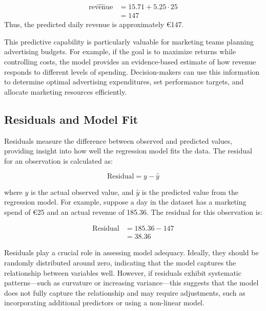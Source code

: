 \documentclass[
]{book}
\theoremstyle{definition}
\theoremstyle{definition}
\theoremstyle{definition}
\theoremstyle{definition}
\theoremstyle{remark}
\begin{document}
\begin{equation} 
\begin{split}
\hat{\text{revenue}} & = 15.71 + 5.25 \cdot 25 \\
 & = 147
\end{split}
\end{equation}
Thus, the predicted daily revenue is approximately €147.

This predictive capability is particularly valuable for marketing teams planning advertising budgets. For example, if the goal is to maximize returns while controlling costs, the model provides an evidence-based estimate of how revenue responds to different levels of spending. Decision-makers can use this information to determine optimal advertising expenditures, set performance targets, and allocate marketing resources efficiently.

\subsection*{Residuals and Model Fit}\label{residuals-and-model-fit}

Residuals measure the difference between observed and predicted values, providing insight into how well the regression model fits the data. The residual for an observation is calculated as:

\[
\text{Residual} = y - \hat{y}
\]

where \(y\) is the actual observed value, and \(\hat{y}\) is the predicted value from the regression model. For example, suppose a day in the dataset has a marketing spend of €25 and an actual revenue of 185.36. The residual for this observation is:

\begin{equation} 
\begin{split}
\text{Residual} & = 185.36 - 147 \\
 & = 38.36
\end{split}
\end{equation}

Residuals play a crucial role in assessing model adequacy. Ideally, they should be randomly distributed around zero, indicating that the model captures the relationship between variables well. However, if residuals exhibit systematic patterns---such as curvature or increasing variance---this suggests that the model does not fully capture the relationship and may require adjustments, such as incorporating additional predictors or using a non-linear model.
\end{document}
